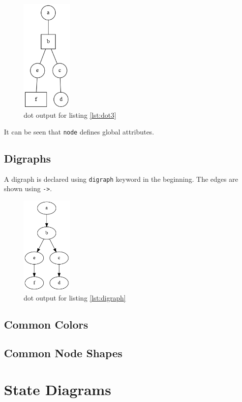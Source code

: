 \documentclass{article}
\begin{document}
	

	\begin{figure}[H]
		\begin{center}
			\includegraphics[width=25mm]{figure3.png}
		\end{center}
		\caption{dot output for listing \ref{lst:dot3} }
		\label{fig:png3}
	\end{figure}

	It can be seen that \lstinline{node} defines global attributes.

	\subsection{Digraphs}
	A digraph is declared using \lstinline{digraph} keyword in the beginning. The edges are shown using \lstinline{->}.

	

	\begin{figure}[H]
		\begin{center}
			\includegraphics[width=25mm]{digraph.png}
		\end{center}
		\caption{dot output for listing \ref{lst:digraph} }
		\label{fig:digraph}
	\end{figure}

	\subsection{Common Colors}

	\subsection{Common Node Shapes}

	\section{State Diagrams}
\end{document}
